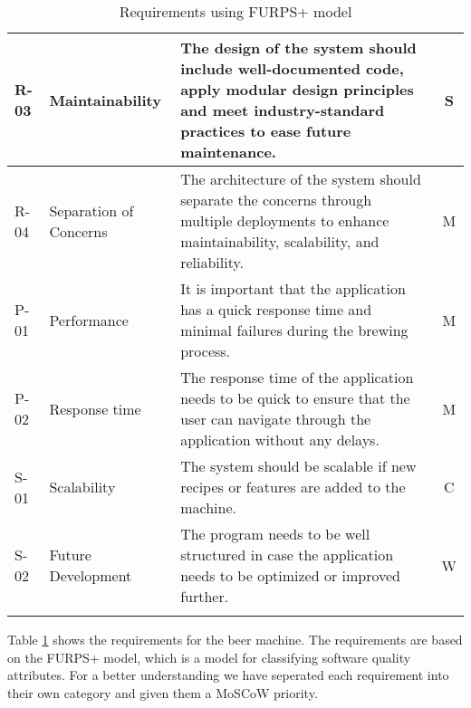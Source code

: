 \begin{center}
\begin{longtable}{|p{1cm}|p{4cm}|p{8.5cm}|c|}
        R-03   & Maintainability            & The design of the system should include well-documented code, apply modular design principles and meet industry-standard practices to ease future maintenance.      & S \\ \hline 
        R-04   & Separation of Concerns     & The architecture of the system should separate the concerns through multiple deployments to enhance maintainability, scalability, and reliability.             & M \\ \hline
        P-01   & Performance                & It is important that the application has a quick response time and minimal failures during the brewing process.                                                & M \\ \hline
        P-02   & Response time              & The response time of the application needs to be quick to ensure that the user can navigate through the application without any delays.                            & M \\ \hline
        S-01   & Scalability                & The system should be scalable if new recipes or features are added to the machine.                                                                  & C \\ \hline
        S-02   & Future Development         & The program needs to be well structured in case the application needs to be optimized or improved further.                                                     & W \\ \hline

        \caption{Requirements using FURPS+ model}
        \label{tab:requirements}
    \end{longtable}
\end{center}

Table \ref{tab:requirements} shows the requirements for the beer machine. The requirements are based on the FURPS+ model, which is a model for classifying software quality attributes. For a better understanding we have seperated each requirement into their own category and given them a MoSCoW priority.







